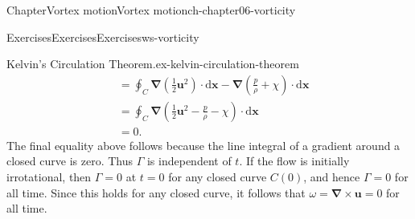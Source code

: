 \documentclass[oneside,10pt,]{book}
\numberwithin{equation}{section}
\newcommand{\de}{\mathrm{d}}
\newcommand{\bx}{\boldsymbol{x}}
\newcommand{\bu}{\boldsymbol{u}}
\newcommand{\bnabla}{\boldsymbol{\nabla}}
\newcommand{\amp}{&}
\begin{document}
\begin{chapterptx}{Chapter}{Vortex motion}{}{Vortex motion}{}{}{ch-chapter06-vorticity}
\begin{exercises-section}{Exercises}{Exercises}{}{Exercises}{}{}{ws-vorticity}
\begin{divisionexercise}{1}{Kelvin’s Circulation Theorem.}{}{ex-kelvin-circulation-theorem}
\begin{align*}
\amp=\oint_C\bnabla\left(\frac12\bu^2\right)\cdot\de\bx-\bnabla\left(\frac{p}{\rho}+\chi\right)\cdot\de\bx\\
\amp=\oint_C\bnabla\left(\frac12\bu^2-\frac{p}{\rho}-\chi\right)\cdot\de\bx\\
\amp=0.
\end{align*}
The final equality above follows because the line integral of a gradient around a closed curve is zero. Thus \(\Gamma\) is independent of \(t\). If the flow is initially irrotational, then \(\Gamma=0\) at \(t=0\) for any closed curve \(C(0)\), and hence \(\Gamma=0\) for all time. Since this holds for any closed curve, it follows that \(\omega=\bnabla\times\bu=0\) for all time.%
\end{divisionexercise}%
\end{exercises-section}
\end{chapterptx}
%
%
\typeout{************************************************}
\typeout{************************************************}
%
\end{document}
